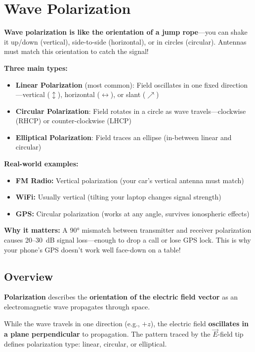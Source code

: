 \chapter{Wave Polarization}
\label{ch:wave-polarization}

\begin{nontechnical}
\textbf{Wave polarization is like the orientation of a jump rope}---you can shake it up/down (vertical), side-to-side (horizontal), or in circles (circular). Antennas must match this orientation to catch the signal!

\textbf{Three main types:}
\begin{itemize}
\item \textbf{Linear Polarization} (most common): Field oscillates in one fixed direction---vertical ($\updownarrow$), horizontal ($\leftrightarrow$), or slant ($\nearrow$)
\item \textbf{Circular Polarization}: Field rotates in a circle as wave travels---clockwise (RHCP) or counter-clockwise (LHCP)
\item \textbf{Elliptical Polarization}: Field traces an ellipse (in-between linear and circular)
\end{itemize}

\textbf{Real-world examples:}
\begin{itemize}
\item \textbf{FM Radio:} Vertical polarization (your car's vertical antenna must match)
\item \textbf{WiFi:} Usually vertical (tilting your laptop changes signal strength)
\item \textbf{GPS:} Circular polarization (works at any angle, survives ionospheric effects)
\end{itemize}

\textbf{Why it matters:} A 90° mismatch between transmitter and receiver polarization causes 20--30~dB signal loss---enough to drop a call or lose GPS lock. This is why your phone's GPS doesn't work well face-down on a table!
\end{nontechnical}

\section{Overview}

\textbf{Polarization} describes the \textbf{orientation of the electric field vector} as an electromagnetic wave propagates through space.

\begin{keyconcept}
While the wave travels in one direction (e.g., $+z$), the electric field \textbf{oscillates in a plane perpendicular} to propagation. The pattern traced by the $\vec{E}$-field tip defines polarization type: linear, circular, or elliptical.
\end{keyconcept}

